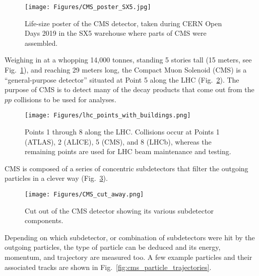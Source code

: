 \begin{figure}[pbth]
\centering
\texttt{[image: Figures/CMS\_poster\_SX5.jpg]}
    \caption{
    Life-size poster of the CMS detector, taken during CERN Open Days 2019
    in the SX5 warehouse where parts of CMS were assembled.}
    \label{fig:cms_poster}
\end{figure}
Weighing in at a whopping 14,000 tonnes, 
standing 5 stories tall (15 meters, see Fig.~\ref{fig:cms_poster}), and reaching 29 meters long, 
the Compact Muon Solenoid (CMS) is a ``general-purpose detector'' situated at Point 5 along the LHC (Fig.~\ref{fig:lhc_points}).
The purpose of CMS is to detect many of the decay products 
that come out from the $pp$ collisions to be used for analyses.
\begin{figure}[pbth]
\centering
\texttt{[image: Figures/lhc\_points\_with\_buildings.png]}
    \caption{
    Points 1 through 8 along the LHC.
    Collisions occur at 
    Points 1 (ATLAS), 2 (ALICE), 5 (CMS), and 8 (LHCb),
    whereas the remaining points are used for LHC beam maintenance and testing.} 
    \label{fig:lhc_points}
\end{figure}
CMS is composed of a series of concentric subdetectors that filter the outgoing particles in a clever way (Fig.~\ref{fig:cms_cut_out_view}).
\begin{figure}[pbth]
\centering
\texttt{[image: Figures/CMS\_cut\_away.png]}
    \caption{Cut out of the CMS detector showing its various subdetector components.} 
    \label{fig:cms_cut_out_view}
\end{figure}
Depending on which subdetector, or combination of subdetectors were hit by the outgoing particles, the type of particle can be deduced and its energy, momentum, and trajectory are measured too.
A few example particles and their associated tracks are shown in Fig.~\ref{fig:cms_particle_trajectories}. 

